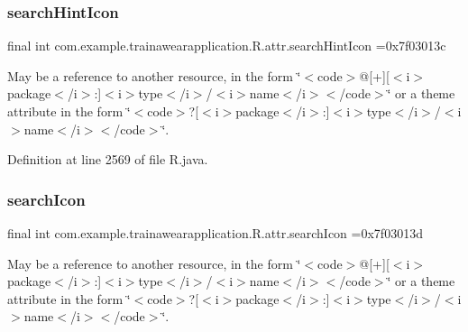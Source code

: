 \mbox{\label{classcom_1_1example_1_1trainawearapplication_1_1_r_1_1attr_acedf5e07b00d287e7806dee9744b1452}} 
\subsubsection{\texorpdfstring{searchHintIcon}{searchHintIcon}}
{\footnotesize\ttfamily final int com.\+example.\+trainawearapplication.\+R.\+attr.\+search\+Hint\+Icon =0x7f03013c\hspace{0.3cm}{\ttfamily [static]}}

May be a reference to another resource, in the form \char`\"{}$<$code$>$@\mbox{[}+\mbox{]}\mbox{[}$<$i$>$package$<$/i$>$\+:\mbox{]}$<$i$>$type$<$/i$>$/$<$i$>$name$<$/i$>$$<$/code$>$\char`\"{} or a theme attribute in the form \char`\"{}$<$code$>$?\mbox{[}$<$i$>$package$<$/i$>$\+:\mbox{]}$<$i$>$type$<$/i$>$/$<$i$>$name$<$/i$>$$<$/code$>$\char`\"{}. 

Definition at line 2569 of file R.\+java.

\mbox{\label{classcom_1_1example_1_1trainawearapplication_1_1_r_1_1attr_ad089ba8a9c60f991fcac60162a9d1a8e}} 
\subsubsection{\texorpdfstring{searchIcon}{searchIcon}}
{\footnotesize\ttfamily final int com.\+example.\+trainawearapplication.\+R.\+attr.\+search\+Icon =0x7f03013d\hspace{0.3cm}{\ttfamily [static]}}

May be a reference to another resource, in the form \char`\"{}$<$code$>$@\mbox{[}+\mbox{]}\mbox{[}$<$i$>$package$<$/i$>$\+:\mbox{]}$<$i$>$type$<$/i$>$/$<$i$>$name$<$/i$>$$<$/code$>$\char`\"{} or a theme attribute in the form \char`\"{}$<$code$>$?\mbox{[}$<$i$>$package$<$/i$>$\+:\mbox{]}$<$i$>$type$<$/i$>$/$<$i$>$name$<$/i$>$$<$/code$>$\char`\"{}. 

